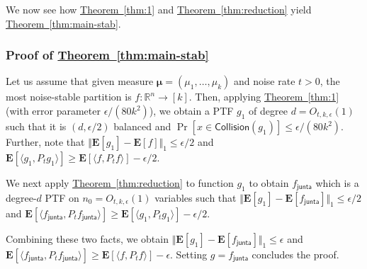 \documentclass[11pt]{article}
\numberwithin{equation}{section}
\theoremstyle{definition}
\theoremstyle{plain}
\newcommand{\expref}[2]{\hyperref[#2]{#1~\ref{#2}}}
\newcommand{\fh}{{f_{\mathsf{junta}}}}
\begin{document}
We now see how \expref{Theorem}{thm:1} and \expref{Theorem}{thm:reduction} yield \expref{Theorem}{thm:main-stab}. 
\subsubsection*{Proof of \expref{Theorem}{thm:main-stab}} 
Let us  assume that given measure $\boldsymbol{\mu} = (\mu_1, \ldots, \mu_k)$ and noise rate $t>0$, the most
%
noise-stable    %
partition is $f: \mathbb{R}^n \rightarrow [k]$. Then, applying \expref{Theorem}{thm:1} (with error parameter $\epsilon/(80k^2)$), we obtain a PTF $g_1$ of degree $d = O_{t, k,\epsilon}(1)$ such that it is $(d,\epsilon/2)$ balanced and $\Pr[x \in \mathsf{Collision}(g_1)]\le \epsilon/(80k^2)$. Further, note that $\Vert \mathbf{E}[g_1] - \mathbf{E}[f] \Vert_1 \le \epsilon/2$ and $\mathbf{E}[\langle g_1, P_t g_1 \rangle] \ge\mathbf{E}[ \langle f, P_t f \rangle] - \epsilon/2$. 

We next apply \expref{Theorem}{thm:reduction} to function $g_1$ to obtain $\fh$ which is a degree-$d$ PTF on $n_0 = O_{t,k, \epsilon}(1)$ variables such that $\Vert \mathbf{E}[g_1] - \mathbf{E}[\fh] \Vert_1 \le \epsilon/2$ and 
$\mathbf{E}[\langle \fh, P_t \fh \rangle] \ge \mathbf{E}[\langle g_1, P_t g_1 \rangle] - \epsilon/2$. 

Combining these two facts, we obtain $\Vert \mathbf{E}[g_1] - \mathbf{E}[\fh] \Vert_1 \le \epsilon$ and 
$\mathbf{E}[\langle \fh, P_t \fh \rangle] \ge \mathbf{E}[\langle f, P_t f \rangle] - \epsilon$. Setting $g = \fh$ concludes the proof. 
\end{document}
